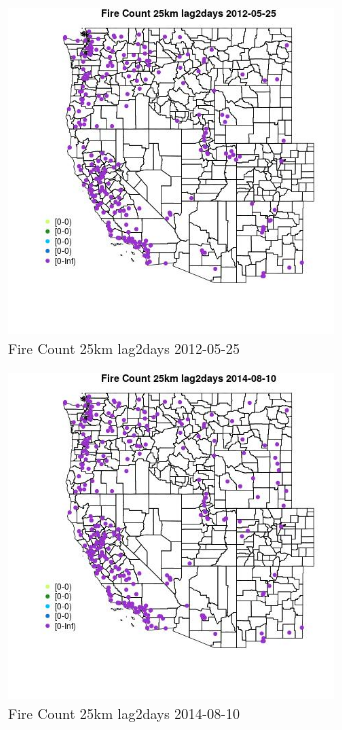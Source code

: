 \begin{figure} 
\centering  
\includegraphics[width=0.77\textwidth]{Code_Outputs/Report_ML_input_PM25_Step4_part_e_de_duplicated_aves_compiled_2019-05-18wNAs_MapObsFire_Count_25km_lag2days2012-05-25.jpg} 
\caption{\label{fig:Report_ML_input_PM25_Step4_part_e_de_duplicated_aves_compiled_2019-05-18wNAsMapObsFire_Count_25km_lag2days2012-05-25}Fire Count 25km lag2days 2012-05-25} 
\end{figure} 
 

\begin{figure} 
\centering  
\includegraphics[width=0.77\textwidth]{Code_Outputs/Report_ML_input_PM25_Step4_part_e_de_duplicated_aves_compiled_2019-05-18wNAs_MapObsFire_Count_25km_lag2days2014-08-10.jpg} 
\caption{\label{fig:Report_ML_input_PM25_Step4_part_e_de_duplicated_aves_compiled_2019-05-18wNAsMapObsFire_Count_25km_lag2days2014-08-10}Fire Count 25km lag2days 2014-08-10} 
\end{figure} 
 

